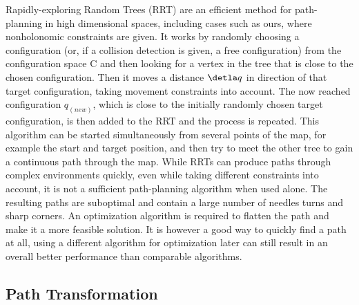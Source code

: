 Rapidly-exploring Random Trees (RRT) are an efficient method for path-planning in high dimensional spaces, including cases such as ours, where nonholonomic constraints are given.\cite{33,34} It works by randomly choosing a configuration (or, if a collision detection is given, a free configuration) from the configuration space C and then looking for a vertex in the tree that is close to the chosen configuration. Then it moves a distance $\detla q$ in direction of that target configuration, taking movement constraints into account. The now reached configuration $q_(new)$, which is close to the initially randomly chosen target configuration, is then added to the RRT and the process is repeated. This algorithm can be started simultaneously from several points of the map, for example the start and target position, and then try to meet the other tree to gain a continuous path through the map. While RRTs can produce paths through complex environments quickly, even while taking different constraints into account, it is not a sufficient path-planning algorithm when used alone. The resulting paths are suboptimal and contain a large number of needles turns and sharp corners. An optimization algorithm is required to flatten the path and make it a more feasible solution. It is however a good way to quickly find a path at all, using a different algorithm for optimization later can still result in an overall better performance than comparable algorithms. 

\subsection{Path Transformation}
\label{sec:pathtransformation}


